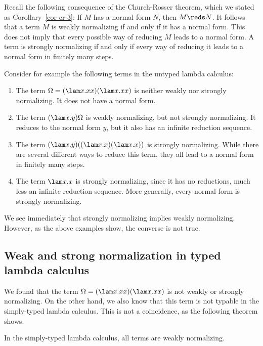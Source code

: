 \documentclass[12pt]{article}
\begin{document}
Recall the following consequence of the Church-Rosser theorem, which
we stated as Corollary~\ref{cor-cr-3}: If $M$ has a normal form $N$,
then $M\reds N$. It follows that a term $M$ is weakly normalizing if
and only if it has a normal form. This does not imply that every
possible way of reducing $M$ leads to a normal form. A term is
strongly normalizing if and only if every way of reducing it leads to
a normal form in finitely many steps. 

Consider for example the following terms in the untyped lambda
calculus:
\begin{enumerate}
\item The term $\Omega=(\lam x.xx)(\lam x.xx)$ is neither weakly nor
  strongly normalizing. It does not have a normal form.
\item The term $(\lam x.y)\Omega$ is weakly normalizing, but not
  strongly normalizing. It reduces to the normal form $y$, but it also
  has an infinite reduction sequence.
\item The term $(\lam x.y)((\lam x.x)(\lam x.x))$ is strongly
  normalizing. While there are several different ways to reduce this
  term, they all lead to a normal form in finitely many steps. 
\item The term $\lam x.x$ is strongly normalizing, since it has no
  reductions, much less an infinite reduction sequence. More
  generally, every normal form is strongly normalizing.
\end{enumerate}

We see immediately that strongly normalizing implies weakly
normalizing. However, as the above examples show, the converse is not
true. 

\subsection{Weak and strong normalization in typed lambda 
  calculus}

We found that the term $\Omega=(\lam x.xx)(\lam x.xx)$ is not weakly
or strongly normalizing. On the other hand, we also know that this
term is not typable in the simply-typed lambda calculus. This is not
a coincidence, as the following theorem shows.

\begin{theorem}\label{thm-weak-norm}
  In the simply-typed lambda calculus, all terms are weakly
  normalizing.
\end{theorem}
\end{document}
